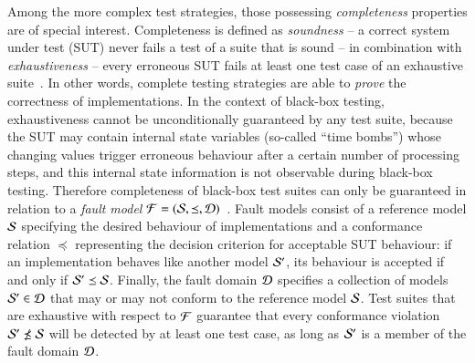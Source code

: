 Among the more complex test strategies, those possessing \emph{completeness} 
properties are of special interest. Completeness is defined as \emph{soundness}
-- a correct system under test (SUT) never fails a test of a   suite that is sound -- in combination with \emph{exhaustiveness} -- every erroneous SUT fails at least one test case of an exhaustive suite~\cite{DBLP:journals/cn/Tretmans96}. In other words,
complete testing strategies are  able to {\it prove} the correctness of implementations.
In the context of black-box testing, exhaustiveness cannot be unconditionally 
guaranteed by any test suite, because the SUT may contain internal state variables
(so-called ``time bombs'') whose changing values trigger erroneous behaviour  after a certain number of processing steps, and this internal state information is not observable
 during black-box testing. Therefore completeness of black-box test suites can
 only be guaranteed in relation to a \emph{fault model} 
 ${\cal F} = ({\cal S},\preceq,{\cal D})$~\cite{petrenko1996}. Fault models consist of
 a reference model ${\cal S}$ specifying the desired behaviour of implementations and
 a conformance relation $\preceq$ representing the decision criterion  for
 acceptable SUT behaviour: if an implementation behaves like another model ${\cal S}'$,
 its behaviour is accepted if and only if ${\cal S}' \preceq {\cal S}$.
 Finally, the fault domain ${\cal D}$ specifies a collection of models 
 ${\cal S}'\in {\cal D}$ that may or may not conform to the reference model ${\cal S}$.
 Test suites that are exhaustive with respect to ${\cal F}$ guarantee that every
 conformance violation   ${\cal S}' \not\preceq {\cal S}$ will be detected by at 
 least one test case, as long as ${\cal S}'$ is a member of the fault domain ${\cal D}$.
 
